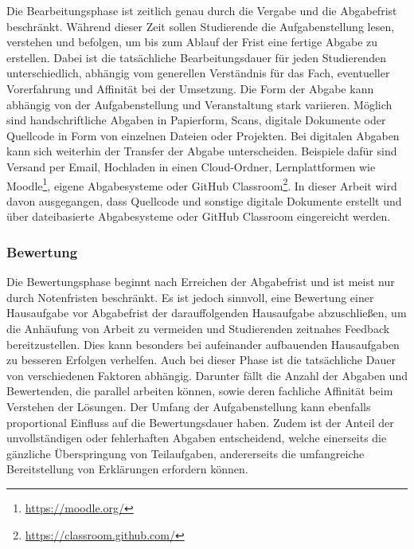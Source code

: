 Die Bearbeitungsphase ist zeitlich genau durch die Vergabe und die Abgabefrist beschränkt.
Während dieser Zeit sollen Studierende die Aufgabenstellung lesen, verstehen und befolgen, um bis zum Ablauf der Frist eine fertige Abgabe zu erstellen.
Dabei ist die tatsächliche Bearbeitungsdauer für jeden Studierenden unterschiedlich, abhängig vom generellen Verständnis für das Fach, eventueller Vorerfahrung und Affinität bei der Umsetzung.
Die Form der Abgabe kann abhängig von der Aufgabenstellung und Veranstaltung stark variieren.
Möglich sind handschriftliche Abgaben in Papierform, Scans, digitale Dokumente oder Quellcode in Form von einzelnen Dateien oder Projekten.
Bei digitalen Abgaben kann sich weiterhin der Transfer der Abgabe unterscheiden.
Beispiele dafür sind Versand per Email, Hochladen in einen Cloud-Ordner, Lernplattformen wie Moodle\footnote{\url{https://moodle.org/}}, eigene Abgabesysteme oder GitHub Classroom\footnote{\url{https://classroom.github.com/}}.
In dieser Arbeit wird davon ausgegangen, dass Quellcode und sonstige digitale Dokumente erstellt und über dateibasierte Abgabesysteme oder GitHub Classroom eingereicht werden.

\subsubsection{Bewertung}

Die Bewertungsphase beginnt nach Erreichen der Abgabefrist und ist meist nur durch Notenfristen beschränkt.
Es ist jedoch sinnvoll, eine Bewertung einer Hausaufgabe vor Abgabefrist der darauffolgenden Hausaufgabe abzuschließen, um die Anhäufung von Arbeit zu vermeiden und Studierenden zeitnahes Feedback bereitzustellen.
Dies kann besonders bei aufeinander aufbauenden Hausaufgaben zu besseren Erfolgen verhelfen.
Auch bei dieser Phase ist die tatsächliche Dauer von verschiedenen Faktoren abhängig.
Darunter fällt die Anzahl der Abgaben und Bewertenden, die parallel arbeiten können, sowie deren fachliche Affinität beim Verstehen der Lösungen.
Der Umfang der Aufgabenstellung kann ebenfalls proportional Einfluss auf die Bewertungsdauer haben.
Zudem ist der Anteil der unvollständigen oder fehlerhaften Abgaben entscheidend, welche einerseits die gänzliche Überspringung von Teilaufgaben, andererseits die umfangreiche Bereitstellung von Erklärungen erfordern können.


